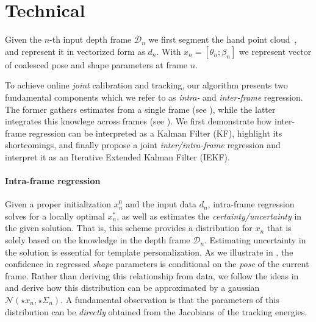 
\section{Technical}
Given the $n$-th input depth frame $\mathcal{D}_n$ we first segment the hand point cloud~\cite{htrack}, and represent it in vectorized form as $d_n$. With $x_n = [\theta_n; \beta_n]$ we represent vector of coalesced pose and shape parameters at frame $n$. 

To achieve online \emph{joint} calibration and tracking, our algorithm presents two fundamental components which we refer to as \emph{intra-} and \emph{inter-frame} regression. The former gathers estimates from a single frame (see ), while the latter integrates this knowlege across frames (see ). We first demonstrate how inter-frame regression can be interpreted as a Kalman Filter (KF), highlight its shortcomings, and finally propose a joint \emph{inter/intra-frame} regression and interpret it as an Iterative Extended Kalman Filter (IEKF).


\paragraph{Intra-frame regression}
Given a proper initialization $x_n^0$ and the input data $d_n$, intra-frame regression solves for a locally optimal $x_n^*$, as well as estimates the \emph{certainty/uncertainty} in the given solution. That is, this scheme provides a distribution for $x_n$ that is solely based on the knowledge in the depth frame $\mathcal{D}_n$. Estimating uncertainty in the solution is essential for template personalization. As we illustrate in , the confidence in regressed \emph{shape} parameters is conditional on the \emph{pose} of the current frame.
Rather than deriving this relationship from data, we follow the ideas in ~ and derive how this distribution can be approximated by a gaussian $\mathcal{N}(\star{x}_n, \star{\Sigma}_n)$. A fundamental observation is that the parameters of this distribution can be \emph{directly} obtained from the Jacobians of the tracking energies.

